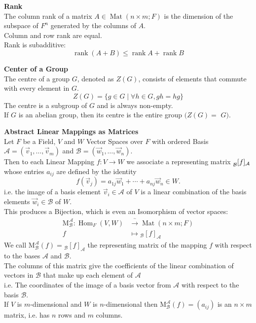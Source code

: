 \documentclass[a4paper, 10pt]{article}
\begin{document}
\begin{multicols*}{3}
\textbf{Rank}\\
The column rank of a matrix $A \in \operatorname{Mat}(n \times m ; F)$ is the dimension of the subspace of $F^n$ generated by the columns of $A$. \\
Column and row rank are equal. \\
Rank is subadditive:
$$
\operatorname{rank}(A+B) \leq \operatorname{rank} A+\operatorname{rank} B
$$

\textbf{Center of a Group}\\
The centre of a group $G$, denoted as $Z(G)$, consists of elements that commute with every element in $G$.\\
$$Z(G)=\{g \in G \mid \forall h \in G, g h=h g\}$$
The centre is a subgroup of $G$ and is always non-empty.\\
If $G$ is an abelian group, then its centre is the entire group $(Z(G)=$ $G)$.

\textbf{Abstract Linear Mappings as Matrices}\\
Let $F$ be a Field, $V$ and $W$ Vector Spaces over $F$ with ordered Basis $\mathcal{A}=\left(\vec{v}_1, \ldots, \vec{v}_m\right)$ and $\mathcal{B}=\left(\vec{w}_1, \ldots, \vec{w}_n\right)$. \\
Then to each Linear Mapping $f: V \rightarrow W$ we associate a representing matrix $\prescript{}{\mathcal{B}}{[f]}_{\mathcal{A}}$ whose entries $a_{i j}$ are defined by the identity
$$
f\left(\vec{v}_j\right)=a_{1 j} \vec{w}_1+\cdots+a_{n j} \vec{w}_n \in W .
$$
i.e. the image of a basis element $\vec{v}_i\in\mathcal{A}$ of $V$ is a linear combination of the basis elements $\vec{w}_i\in\mathcal{B}$ of $W$.\\
This produces a Bijection, which is even an Isomorphism of vector spaces:
\begin{align*}
\mathrm{M}_{\mathcal{B}}^{\mathcal{A}}: \operatorname{Hom}_F(V, W) & \xrightarrow{\overset{\sim}{}}  \operatorname{Mat}(n \times m ; F) \\
f & \mapsto{ }_{\mathcal{B}}[f]_{\mathcal{A}}
\end{align*}
We call $\mathrm{M}_{\mathcal{B}}^{\mathcal{A}}(f)={ }_{\mathcal{B}}[f]_{\mathcal{A}}$ the representing matrix of the mapping $f$ with respect to the bases $\mathcal{A}$ and $\mathcal{B}$. \\
The columns of this matrix give the coefficients of the linear combination of vectors in $\mathcal{B}$ that make up each element of $\mathcal{A}$\\
i.e. The coordinates of the image of a basis vector from $\mathcal{A}$ with respect to the basis $\mathcal{B}$. \\
If $V$ is $m$-dimensional and $W$ is $n$-dimensional then $\mathrm{M}_{\mathcal{B}}^{\mathcal{A}}(f)=\left(a_{i j}\right)$ is an $n \times m$ matrix, i.e. has $n$ rows and $m$ columns.


\end{multicols*}
\end{document}
